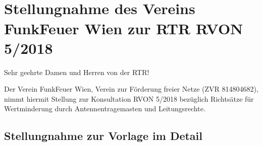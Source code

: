 \documentclass[parskip=half]{scrreprt}
\begin{document}
\section*{\\Stellungnahme des Vereins FunkFeuer Wien zur RTR RVON 5/2018}
\thispagestyle{fancy}

Sehr geehrte Damen und Herren von der RTR!

Der Verein FunkFeuer Wien, Verein zur Förderung freier Netze
(ZVR 814804682), nimmt hiermit Stellung zur Konsultation
RVON 5/2018 bezüglich Richtsätze für Wertminderung durch
Antennentragemasten und Leitungsrechte.


\subsection*{Stellungnahme zur Vorlage im Detail}
\end{document}
